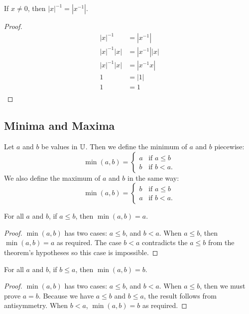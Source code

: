 \documentclass[../../math.tex]{subfiles}
\begin{document}
\begin{theorem}
    If $x \neq 0$, then $|x|^{-1} = |x^{-1}|$.
\end{theorem}
\begin{proof}
    \begin{align*}
        |x|^{-1} &= |x^{-1}| \\
        |x|^{-1} |x| &= |x^{-1}| |x| \\
        |x|^{-1} |x| &= |x^{-1}x| \\
        1 &= |1| \\
        1 &= 1 \\
    \end{align*}
\end{proof}

\subsection{Minima and Maxima}

\begin{definition}
    Let $a$ and $b$ be values in $\mathbb{U}$.  Then we define the minimum of $a$ and
    $b$ piecewise:
    \[
        \min(a, b) = \begin{cases}
            a & \text{if $a \leq b$} \\
            b & \text{if $b < a$.}
        \end{cases}
    \]
    We also define the maximum of $a$ and $b$ in the same way:
    \[
        \min(a, b) = \begin{cases}
            b & \text{if $a \leq b$} \\
            a & \text{if $b < a$.}
        \end{cases}
    \]
\end{definition}

\begin{theorem}
    For all $a$ and $b$, if $a \leq b$, then $\min(a, b) = a$.
\end{theorem}
\begin{proof}
    $\min(a, b)$ has two cases: $a \leq b$, and $b < a$.  When $a \leq b$, then
    $\min(a, b) = a$ as required.  The case $b < a$ contradicts the $a \leq b$
    from the theorem's hypotheses so this case is impossible.
\end{proof}

\begin{theorem}
    For all $a$ and $b$, if $b \leq a$, then $\min(a, b) = b$.
\end{theorem}
\begin{proof}
    $\min(a, b)$ has two cases: $a \leq b$, and $b < a$.  When $a \leq b$, then
    we must prove $a = b$.  Because we have $a \leq b$ and $b \leq a$, the
    result follows from antisymmetry.  When $b < a$, $\min(a, b) = b$ as
    required.
\end{proof}
\end{document}
